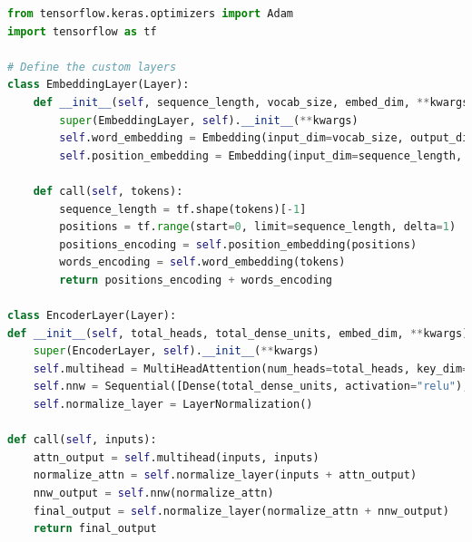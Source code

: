 \begin{tcolorbox}[colback=gray!5!white, colframe=gray!80!black, boxrule=0.5pt, title=Hierarchical Ensemble Model 1] 
    \begin{lstlisting}[language=Python]
from tensorflow.keras.optimizers import Adam
import tensorflow as tf

# Define the custom layers
class EmbeddingLayer(Layer):
    def __init__(self, sequence_length, vocab_size, embed_dim, **kwargs):
        super(EmbeddingLayer, self).__init__(**kwargs)
        self.word_embedding = Embedding(input_dim=vocab_size, output_dim=embed_dim)
        self.position_embedding = Embedding(input_dim=sequence_length, output_dim=embed_dim)

    def call(self, tokens):
        sequence_length = tf.shape(tokens)[-1]
        positions = tf.range(start=0, limit=sequence_length, delta=1)
        positions_encoding = self.position_embedding(positions)
        words_encoding = self.word_embedding(tokens)
        return positions_encoding + words_encoding

class EncoderLayer(Layer):
def __init__(self, total_heads, total_dense_units, embed_dim, **kwargs):
    super(EncoderLayer, self).__init__(**kwargs)
    self.multihead = MultiHeadAttention(num_heads=total_heads, key_dim=embed_dim)
    self.nnw = Sequential([Dense(total_dense_units, activation="relu"), Dense(embed_dim)])
    self.normalize_layer = LayerNormalization()

def call(self, inputs):
    attn_output = self.multihead(inputs, inputs)
    normalize_attn = self.normalize_layer(inputs + attn_output)
    nnw_output = self.nnw(normalize_attn)
    final_output = self.normalize_layer(normalize_attn + nnw_output)
    return final_output
    \end{lstlisting}
\end{tcolorbox}

